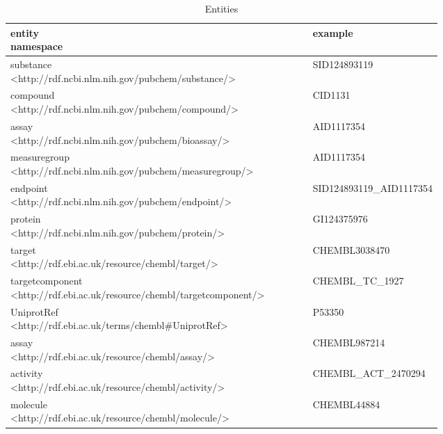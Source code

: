 \begin{table}
\caption{Entities}
\label{tab:opddr_02}
\centering
\begin{tabular}{p{0.7\linewidth}p{0.3\linewidth}}
\hline
\makecell[l]{\textbf{entity} \\ namespace} & \textbf{example} \\
\hline
\makecell[l]{substance \\ \textless http://rdf.ncbi.nlm.nih.gov/pubchem/substance/\textgreater} & SID124893119 \\
\makecell[l]{compound \\ \textless http://rdf.ncbi.nlm.nih.gov/pubchem/compound/\textgreater} & CID1131 \\
\makecell[l]{assay \\ \textless http://rdf.ncbi.nlm.nih.gov/pubchem/bioassay/\textgreater} & AID1117354 \\
\makecell[l]{measuregroup \\ \textless http://rdf.ncbi.nlm.nih.gov/pubchem/measuregroup/\textgreater} & AID1117354 \\
\makecell[l]{endpoint \\ \textless http://rdf.ncbi.nlm.nih.gov/pubchem/endpoint/\textgreater} & SID124893119\_AID1117354 \\
\makecell[l]{protein \\ \textless http://rdf.ncbi.nlm.nih.gov/pubchem/protein/\textgreater} & GI124375976 \\
\makecell[l]{target \\ \textless http://rdf.ebi.ac.uk/resource/chembl/target/\textgreater} & CHEMBL3038470 \\
\makecell[l]{targetcomponent \\ \textless http://rdf.ebi.ac.uk/resource/chembl/targetcomponent/\textgreater} & CHEMBL\_TC\_1927 \\
\makecell[l]{UniprotRef \\ \textless http://rdf.ebi.ac.uk/terms/chembl\#UniprotRef\textgreater} & P53350 \\
\makecell[l]{assay \\ \textless http://rdf.ebi.ac.uk/resource/chembl/assay/\textgreater} & CHEMBL987214 \\
\makecell[l]{activity \\ \textless http://rdf.ebi.ac.uk/resource/chembl/activity/\textgreater} & CHEMBL\_ACT\_2470294 \\
\makecell[l]{molecule \\ \textless http://rdf.ebi.ac.uk/resource/chembl/molecule/\textgreater} & CHEMBL44884 \\
\hline
\end{tabular}
\end{table}

